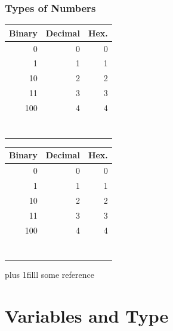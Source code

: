 \documentclass[fleqn]{beamer} %
\newcommand{\sectiontitleI}{Types of Numbers} %
\newcommand{\sectiontitleII}{Variables and Type}
\newcommand{\btVFill}{\vskip0pt plus 1filll}
\begin{document}
\begin{frame} \small
\frametitle{\sectiontitleI}
\bigskip

\begin{multicols}{2}
\begin{tabular}{|r|r|r|} \hline
	Binary 	& Decimal 	& Hex. \\ \hline
	0		& 0			& 0 		\\ \hline	
	1		& 1			& 1 		\\ \hline
	10		& 2			& 2 		\\ \hline
	11		& 3			& 3 		\\ \hline
	100		& 4			& 4 		\\ \hline
	& 			&  		\\ \hline
	& 			&  		\\ \hline
	& 			&  		\\ \hline
	& 			&  		\\ \hline
	& 			&  		\\ \hline
	& 		&  		\\ \hline
	& 		&  		\\ \hline
\end{tabular}

\begin{tabular}{|r|r|r|} \hline
	Binary\hspace{18mm} 	& Decimal 	& Hex. \\ \hline
	0		& 0			& 0 		\\ \hline	
	1		& 1			& 1 		\\ \hline
	10		& 2			& 2 		\\ \hline
	11		& 3			& 3 		\\ \hline
	100		& 4			& 4 		\\ \hline
	& 			&  		\\ \hline
	& 			&  		\\ \hline
	& 			&  		\\ \hline
	& 			&  		\\ \hline
	& 			&  		\\ \hline
	& 		&  		\\ \hline
	& 		&  		\\ \hline
\end{tabular}
\end{multicols}

\btVFill
\tiny{some reference}	
\end{frame}


\section{\sectiontitleII}
\end{document}
